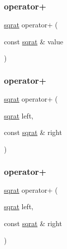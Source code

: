 \mbox{\label{classsqrat_a5a4ae2683cd1f23c81c09229d1dcc34a}} 
\subsubsection{\texorpdfstring{operator+}{operator+}\hspace{0.1cm}{\footnotesize\ttfamily [2/4]}}
{\footnotesize\ttfamily \mbox{\hyperlink{classsqrat}{sqrat}} operator+ (\begin{DoxyParamCaption}\item[{const \mbox{\hyperlink{classsqrat}{sqrat}} \&}]{value }\end{DoxyParamCaption})\hspace{0.3cm}{\ttfamily [friend]}}

\mbox{\label{classsqrat_a714592d215fdb454264df3d7bfbe0b5e}} 
\subsubsection{\texorpdfstring{operator+}{operator+}\hspace{0.1cm}{\footnotesize\ttfamily [3/4]}}
{\footnotesize\ttfamily \mbox{\hyperlink{classsqrat}{sqrat}} operator+ (\begin{DoxyParamCaption}\item[{\mbox{\hyperlink{classsqrat}{sqrat}}}]{left,  }\item[{const \mbox{\hyperlink{classsqrat}{sqrat}} \&}]{right }\end{DoxyParamCaption})\hspace{0.3cm}{\ttfamily [friend]}}

\mbox{\label{classsqrat_a714592d215fdb454264df3d7bfbe0b5e}} 
\subsubsection{\texorpdfstring{operator+}{operator+}\hspace{0.1cm}{\footnotesize\ttfamily [4/4]}}
{\footnotesize\ttfamily \mbox{\hyperlink{classsqrat}{sqrat}} operator+ (\begin{DoxyParamCaption}\item[{\mbox{\hyperlink{classsqrat}{sqrat}}}]{left,  }\item[{const \mbox{\hyperlink{classsqrat}{sqrat}} \&}]{right }\end{DoxyParamCaption})\hspace{0.3cm}{\ttfamily [friend]}}

